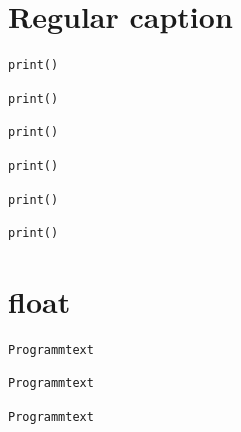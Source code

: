 \documentclass[a4paper,11pt]{article}
\makeatletter
\let\@makecaption@ORI\@makecaption
\let\lst@MakeCaption@ORI\lst@MakeCaption
\let\@makecaption@CAPTION\@makecaption
\let\lst@MakeCaption@CAPTION\lst@MakeCaption}
\newcommand\Original{\let\@makecaption\@makecaption@ORI\let\lst@MakeCaption\lst@MakeCaption@ORI}
\newcommand\Caption{\let\@makecaption\@makecaption@CAPTION\let\lst@MakeCaption\lst@MakeCaption@CAPTION}
\makeatother
\begin{document}
\section*{Regular caption}

\Original

\begin{lstlisting}[caption=Some caption,captionpos=t]
print()
\end{lstlisting}

\begin{lstlisting}[caption=Some caption,captionpos=b]
print()
\end{lstlisting}

\Caption\captionsetup{box=none}

\begin{lstlisting}[caption=Some caption,captionpos=t]
print()
\end{lstlisting}

\begin{lstlisting}[caption=Some caption,captionpos=b]
print()
\end{lstlisting}

\captionsetup{box=colorbox,boxcolor=orange!20}

\begin{lstlisting}[caption=Some caption,captionpos=t]
print()
\end{lstlisting}

\begin{lstlisting}[caption=Some caption,captionpos=b]
print()
\end{lstlisting}

\clearpage
\section*{float}

\Original

\begin{lstlisting}[float,caption=Eine Caption,frame=trbl]
Programmtext
\end{lstlisting}

\Caption\captionsetup{box=none}

\begin{lstlisting}[float,caption=Eine Caption,frame=trbl]
Programmtext
\end{lstlisting}

\captionsetup{box=colorbox,boxcolor=orange!20}

\begin{lstlisting}[float,caption=Eine Caption,frame=trbl]
Programmtext
\end{lstlisting}
\end{document}

